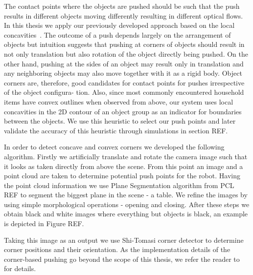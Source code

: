 The contact points where the objects are pushed should
be such that the push results in different objects moving
differently resulting in different optical flows.
In  this thesis we apply our previously developed approach based on 
the local concavities~\cite{bersch12interactive}. The outcome
of a push depends largely on the arrangement of objects but
intuition suggests that pushing at corners of objects should
result in not only translation but also rotation of the object
directly being pushed. On the other hand, pushing at the
sides of an object may result only in translation and any
neighboring objects may also move together with it as a
rigid body. Object corners are, therefore, good candidates for
contact points for pushes irrespective of the object configura-
tion. Also, since most
commonly  encountered  household   items  have  convex  outlines  when
observed  from  above,  our  system  uses  local
concavities in the  2D contour of an object group  as an indicator for
boundaries between the objects.
We use this heuristic to select our push points and later
validate the accuracy of this heuristic through simulations in
section REF.

In order to detect concave and convex corners we developed the following algorithm. Firstly we artificially translate and rotate the camera image such that it looks as taken directly from above the scene. From this point an image and a point cloud are taken to determine potential push points for the robot. Having the point cloud information we use Plane Segmentation algorithm from PCL REF to segment the biggest plane in the scene - a table. We refine the images by using simple morphological operations - opening and closing. After these steps we obtain black and white images where everything but objects is black, an example is depicted in Figure REF. 

Taking this image as an output we use Shi-Tomasi corner detector to determine corner positions and their orientation. As the implementation details of the corner-based pushing go beyond the scope of this thesis, we refer the reader to~\cite{bersch12interactive} for details.

